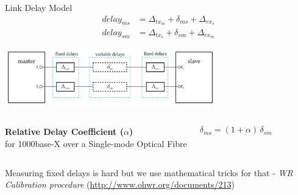 \documentclass[compress,red]{beamer}
\begin{document}
\begin{frame}{Link Delay Model}
 \begin{align}
   \nonumber delay_{ms} &= \Delta_{tx_m} + \delta_{ms} + \Delta_{rx_s} \\
   \nonumber delay_{sm} &= \Delta_{tx_s} + \delta_{sm} + \Delta_{rx_m}
 \end{align}

  \vspace{0.2cm}

 \begin{center}
 \includegraphics[height=2.5cm]{protocol/delaymodel.pdf}
 \end{center}

  {
 \begin{columns}[c]
   \column{2.8in}
 
     \begin{center}
       \textbf{Relative Delay Coefficient ($\alpha$)} \\
       for 1000base-X over a Single-mode Optical Fibre
     \end{center}
 
   \column{1.5in}
     \begin{center}
       \begin{equation}
       \nonumber \delta_{ms} = (1 + \alpha) \, \delta_{sm}
       \end{equation}
     \end{center}
     \vspace{0.5cm}
 \end{columns}}

  {
 \begin{block}{Measuring fixed delays is hard}
 	but we use mathematical tricks for that - \emph{WR Calibration procedure} (\url{http://www.ohwr.org/documents/213})
 \end{block}}

\end{frame}
\end{document}
